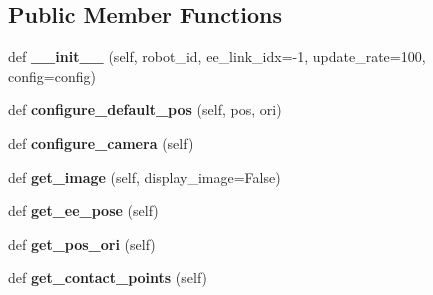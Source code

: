 \subsection*{Public Member Functions}
\begin{DoxyCompactItemize}
\item 
\hypertarget{classaml__robot_1_1bullet_1_1bullet__robot_1_1_bullet_robot_a6b3ae3bf33c82841f4e3943219857196}{}\label{classaml__robot_1_1bullet_1_1bullet__robot_1_1_bullet_robot_a6b3ae3bf33c82841f4e3943219857196} 
def {\bfseries \+\_\+\+\_\+init\+\_\+\+\_\+} (self, robot\+\_\+id, ee\+\_\+link\+\_\+idx=-\/1, update\+\_\+rate=100, config=config)
\item 
\hypertarget{classaml__robot_1_1bullet_1_1bullet__robot_1_1_bullet_robot_ad10caee8cc63ef2bcc97fb55702d9958}{}\label{classaml__robot_1_1bullet_1_1bullet__robot_1_1_bullet_robot_ad10caee8cc63ef2bcc97fb55702d9958} 
def {\bfseries configure\+\_\+default\+\_\+pos} (self, pos, ori)
\item 
\hypertarget{classaml__robot_1_1bullet_1_1bullet__robot_1_1_bullet_robot_aaece8f485ef16919ec61abb6d040333a}{}\label{classaml__robot_1_1bullet_1_1bullet__robot_1_1_bullet_robot_aaece8f485ef16919ec61abb6d040333a} 
def {\bfseries configure\+\_\+camera} (self)
\item 
\hypertarget{classaml__robot_1_1bullet_1_1bullet__robot_1_1_bullet_robot_a0437cbe9e837d8ed6066a65ca37ce117}{}\label{classaml__robot_1_1bullet_1_1bullet__robot_1_1_bullet_robot_a0437cbe9e837d8ed6066a65ca37ce117} 
def {\bfseries get\+\_\+image} (self, display\+\_\+image=False)
\item 
\hypertarget{classaml__robot_1_1bullet_1_1bullet__robot_1_1_bullet_robot_a242f8eef082ed80fa292f2c0e0446a36}{}\label{classaml__robot_1_1bullet_1_1bullet__robot_1_1_bullet_robot_a242f8eef082ed80fa292f2c0e0446a36} 
def {\bfseries get\+\_\+ee\+\_\+pose} (self)
\item 
\hypertarget{classaml__robot_1_1bullet_1_1bullet__robot_1_1_bullet_robot_ae324ebfe5b674a265cedbe78febbe20a}{}\label{classaml__robot_1_1bullet_1_1bullet__robot_1_1_bullet_robot_ae324ebfe5b674a265cedbe78febbe20a} 
def {\bfseries get\+\_\+pos\+\_\+ori} (self)
\item 
\hypertarget{classaml__robot_1_1bullet_1_1bullet__robot_1_1_bullet_robot_adc85278854727d3085e3a422b6076be7}{}\label{classaml__robot_1_1bullet_1_1bullet__robot_1_1_bullet_robot_adc85278854727d3085e3a422b6076be7} 
def {\bfseries get\+\_\+contact\+\_\+points} (self)
\item 
\hypertarget{classaml__robot_1_1bullet_1_1bullet__robot_1_1_bullet_robot_a01f55ce989e815b15e94d2646bc3a674}{}\label{classaml__robot_1_1bullet_1_1bullet__robot_1_1_bullet_robot_a01f55ce989e815b15e94d2646bc3a674} 

\end{DoxyCompactItemize}
